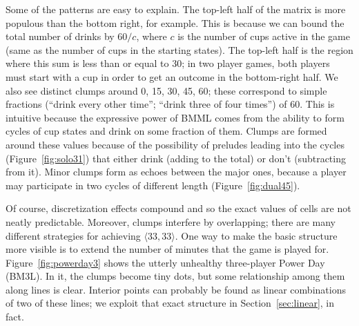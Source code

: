 \documentclass[twocolumn]{article}
\begin{document}
Some of the patterns are easy to explain. The top-left half of the
matrix is more populous than the bottom right, for example. This is
because we can bound the total number of drinks by $60 / c$, where $c$
is the number of cups active in the game (same as the number of cups
in the starting states). The top-left half is the region where this
sum is less than or equal to 30; in two player games, both players
must start with a cup in order to get an outcome in the bottom-right
half. We also see distinct clumps around 0, 15, 30, 45, 60; these
correspond to simple fractions (``drink every other time''; ``drink
three of four times'') of 60. This is intuitive because the expressive
power of BMML comes from the ability to form cycles of cup states and
drink on some fraction of them. Clumps are formed around these values
because of the possibility of preludes leading into the cycles
(Figure~\ref{fig:solo31}) that either drink (adding to the total) or
don't (subtracting from it). Minor clumps form as echoes between the
major ones, because a player may participate in two cycles of
different length (Figure~\ref{fig:dual45}).

Of course, discretization effects compound and so the exact values of
cells are not neatly predictable. Moreover, clumps interfere by
overlapping; there are many different strategies for achieving
$\langle 33, 33 \rangle$. One way to make the basic structure more
visible is to extend the number of minutes that the game is played
for. Figure~\ref{fig:powerday3} shows the utterly unhealthy
three-player Power Day (BM3L). In it, the clumps become tiny dots,
but some relationship among them along lines is clear. Interior points
can probably be found as linear combinations of two of these lines;
we exploit that exact structure in Section~\ref{sec:linear}, in fact.
\end{document}
